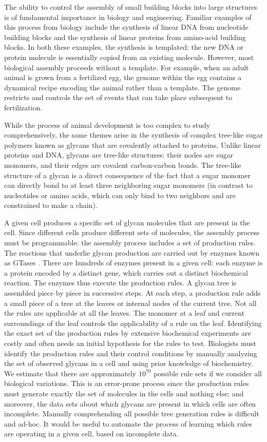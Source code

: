 The ability to control the assembly of small building blocks into large structures is of fundamental importance in biology and engineering. Familiar examples of this process from biology include the synthesis of linear DNA from nucleotide building blocks and the synthesis of linear proteins from amino-acid building blocks. In both these examples, the synthesis is templated: the new DNA or protein molecule is essentially copied from an existing molecule. However, most biological assembly proceeds without a template. For example, when an adult animal is grown from a fertilized egg, the genome within the egg contains a dynamical recipe encoding the animal rather than a template. The genome restricts and controls the set of events that can take place subsequent to fertilization.

While the process of animal development is too complex to study comprehensively, the same themes arise in the synthesis of complex tree-like sugar polymers known as glycans \cite{Varki2017} that are covalently attached to proteins. Unlike linear proteins and DNA, glycans are tree-like structures: their nodes are sugar monomers, and their edges are covalent carbon-carbon bonds. The tree-like structure of a glycan is a direct consequence of the fact that a sugar monomer can directly bond to at least three neighboring sugar monomers (in contrast to nucleotides or amino acids, which can only bind to two neighbors and are constrained to make a chain).

A given cell produces a specific set of glycan molecules that are present in the cell. Since different cells produce different sets of molecules,
the assembly process must be programmable: the assembly process includes a set of production rules. The reactions that underlie glycan production are carried out by enzymes known as GTases \cite{Varki2017}. There are hundreds of enzymes present in a given cell: each enzyme is a protein encoded by a distinct gene, which carries out a distinct biochemical reaction. The enzymes thus execute the production rules. A glycan tree is assembled piece by piece in successive steps. At each step, a production rule adds a small piece of a tree %
at the leaves or internal nodes of the current tree.
Not all the rules are applicable at all the leaves. The monomer at a leaf and current surroundings of the leaf controls
the applicability of a rule on the leaf.
Identifying the exact set of the production rules by extensive
biochemical experiments are costly and often needs an initial
hypothesis for the rules to test. Biologists must identify the production rules and their control
conditions by manually analyzing the set of observed glycans in a cell
and using prior knowledge of biochemistry.
We estimate that there are approximately $10^{70}$
possible rule sets if we consider all biological variations.
This is an error-prone process since the production rules must generate
exactly the set of molecules in the cells and nothing else; and moreover, the data sets about which glycans are present in which cells are often incomplete. Manually comprehending all possible tree generation rules is difficult and ad-hoc. It would be useful to automate the process of learning which rules are operating in a given cell, based on incomplete data.

